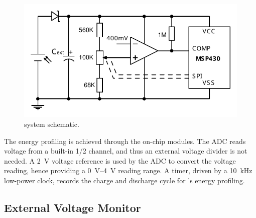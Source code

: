 \begin{figure}[!t]
    \centering
    \includegraphics[width=\columnwidth]{ch5_optic/figures/circuit_v2.pdf}
    \caption{\nn{} system schematic. }
    \label{fig:schematic}
\end{figure}

The energy profiling is achieved through the on-chip modules.
The ADC reads voltage from a built-in 1/2  channel, and thus an external voltage divider is not needed. 
A \SI{2}{\volt} voltage reference is used by the ADC to convert the voltage reading, hence providing a \SIrange{0}{4}{\volt} reading range. 
A timer, driven by a \SI{10}{\kilo\hertz} low-power clock, records the charge and discharge cycle for \nn{}'s energy profiling.

\subsection{External Voltage Monitor}

